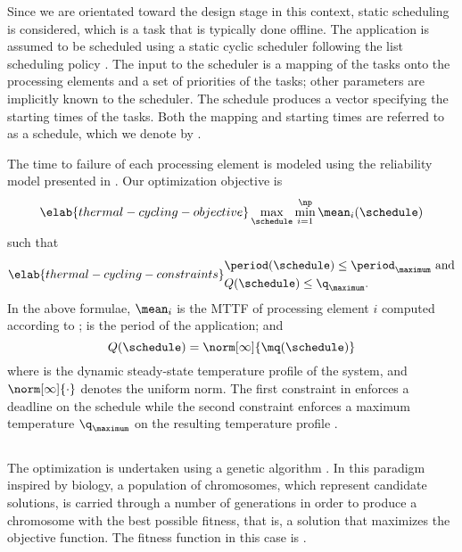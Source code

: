 Since we are orientated toward the design stage in this context, static
scheduling is considered, which is a task that is typically done offline. The
application is assumed to be scheduled using a static cyclic scheduler following
the list scheduling policy \cite{adam1974}. The input to the scheduler is a
mapping of the tasks onto the processing elements and a set of priorities of the
tasks; other parameters are implicitly known to the scheduler. The schedule
produces a vector specifying the starting times of the tasks. Both the mapping
and starting times are referred to as a schedule, which we denote by \schedule.

The time to failure of each processing element is modeled using the reliability
model presented in . Our optimization objective is
\begin{equation} \elab{thermal-cycling-objective}
  \max_{\schedule} \min_{i = 1}^\np \mean_i(\schedule)
\end{equation}
such that
\begin{align} \elab{thermal-cycling-constraints}
  \begin{split}
    & \period(\schedule) \leq \period_\maximum \text{ and} \\
    & Q(\schedule) \leq \q_\maximum.
  \end{split}
\end{align}
In the above formulae, $\mean_i$ is the \ac{MTTF} of processing element $i$
computed according to ; \period is the period of
the application; and
\[
  Q(\schedule) = \norm[\infty]{\mq(\schedule)}
\]
where \mq is the dynamic steady-state temperature profile of the system, and
$\norm[\infty]{\cdot}$ denotes the uniform norm. The first constraint in
 enforces a deadline on the schedule while the
second constraint enforces a maximum temperature $\q_\maximum$ on the resulting
temperature profile \mq.

\subsection{\solutiontitle}

The optimization is undertaken using a genetic algorithm \cite{schmitz2004}. In
this paradigm inspired by biology, a population of chromosomes, which represent
candidate solutions, is carried through a number of generations in order to
produce a chromosome with the best possible fitness, that is, a solution that
maximizes the objective function. The fitness function in this case is
.

